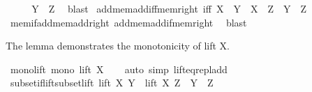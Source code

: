 \begin{isabellebody}
\isanewline
\ \ \isamarkupfalse%
\ \isamarkupfalse%
\ {\isachardoublequoteopen}Y\ {\isasymin}\ Z{\isachardoublequoteclose}\ \isamarkupfalse%
\ blast\isanewline
{}\isamarkupfalse%
%
\endisatagproof
{\isafoldproof}%
%
\isadelimproof
\isanewline
%
\endisadelimproof
\isanewline
{}\isamarkupfalse%
\ add{\isacharunderscore}{\kern0pt}mem{\isacharunderscore}{\kern0pt}add{\isacharunderscore}{\kern0pt}iff{\isacharunderscore}{\kern0pt}mem{\isacharunderscore}{\kern0pt}right\ {\isacharbrackleft}{\kern0pt}iff{\isacharbrackright}{\kern0pt}{\isacharcolon}{\kern0pt}\ {\isachardoublequoteopen}X\ {\isacharplus}{\kern0pt}\ Y\ {\isasymin}\ X\ {\isacharplus}{\kern0pt}\ Z\ {\isasymlongleftrightarrow}\ Y\ {\isasymin}\ Z{\isachardoublequoteclose}\isanewline
%
\isadelimproof
\ \ %
\endisadelimproof
%
\isatagproof
{}\isamarkupfalse%
\ mem{\isacharunderscore}{\kern0pt}if{\isacharunderscore}{\kern0pt}add{\isacharunderscore}{\kern0pt}mem{\isacharunderscore}{\kern0pt}add{\isacharunderscore}{\kern0pt}right\ add{\isacharunderscore}{\kern0pt}mem{\isacharunderscore}{\kern0pt}add{\isacharunderscore}{\kern0pt}if{\isacharunderscore}{\kern0pt}mem{\isacharunderscore}{\kern0pt}right\ \isamarkupfalse%
\ blast%
\endisatagproof
{\isafoldproof}%
%
\isadelimproof
%
\endisadelimproof
%
\begin{isamarkuptext}%
The lemma demonstrates the monotonicity of lift X.%
\end{isamarkuptext}\isamarkuptrue%
\isamarkupfalse%
\ mono{\isacharunderscore}{\kern0pt}lift{\isacharcolon}{\kern0pt}\ {\isachardoublequoteopen}mono\ {\isacharparenleft}{\kern0pt}lift\ X{\isacharparenright}{\kern0pt}{\isachardoublequoteclose}\isanewline
%
\isadelimproof
\ \ %
\endisadelimproof
%
\isatagproof
{}\isamarkupfalse%
\ {\isacharparenleft}{\kern0pt}auto\ simp{\isacharcolon}{\kern0pt}\ lift{\isacharunderscore}{\kern0pt}eq{\isacharunderscore}{\kern0pt}repl{\isacharunderscore}{\kern0pt}add{\isacharparenright}{\kern0pt}%
\endisatagproof
{\isafoldproof}%
%
\isadelimproof
\isanewline
%
\endisadelimproof
\isanewline
{}\isamarkupfalse%
\ subset{\isacharunderscore}{\kern0pt}if{\isacharunderscore}{\kern0pt}lift{\isacharunderscore}{\kern0pt}subset{\isacharunderscore}{\kern0pt}lift{\isacharcolon}{\kern0pt}\ {\isachardoublequoteopen}lift\ X\ Y\ {\isasymsubseteq}\ lift\ X\ Z\ {\isasymLongrightarrow}\ Y\ {\isasymsubseteq}\ Z{\isachardoublequoteclose}\isanewline
%
\isadelimproof
\ \ %
\endisadelimproof
%
\isatagproof

\end{isabellebody}
